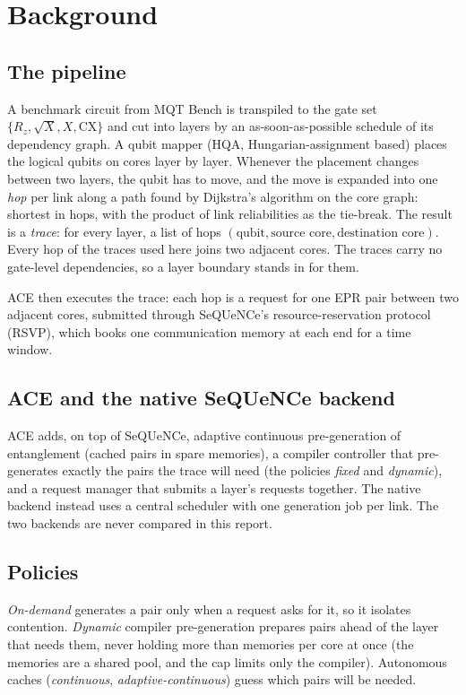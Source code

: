 \chapter{Background}

\section{The pipeline}
A benchmark circuit from MQT Bench is transpiled to the gate set $\{R_z,\sqrt X,X,\mathrm{CX}\}$ and cut into layers by an
as-soon-as-possible schedule of its dependency graph. A qubit mapper (HQA, Hungarian-assignment based) places the logical
qubits on cores layer by layer. Whenever the placement changes between two layers, the qubit has to move, and the move is expanded into one
\emph{hop} per link along a path found by Dijkstra's algorithm on the core graph: shortest in hops, with the product of
link reliabilities as the tie-break. The result is a \emph{trace}: for every layer, a list of hops
$(\text{qubit},\text{source core},\text{destination core})$. Every hop of the traces used here joins two adjacent cores.
The traces carry no gate-level dependencies, so a layer boundary stands in for them.

ACE then executes the trace: each hop is a request for one EPR pair between two adjacent cores, submitted through
SeQUeNCe's resource-reservation protocol (RSVP), which books one communication memory at each end for a time window.

\section{ACE and the native SeQUeNCe backend}
ACE adds, on top of SeQUeNCe, adaptive continuous pre-generation of entanglement (cached pairs in spare memories), a compiler
controller that pre-generates exactly the pairs the trace will need (the policies \emph{fixed} and \emph{dynamic}),
and a request manager that submits a layer's requests together. The native backend instead uses a central scheduler
with one generation job per link. The two backends are never compared in this report.

\section{Policies}
\emph{On-demand} generates a pair only when a request asks for it, so it isolates contention. \emph{Dynamic} compiler
pre-generation prepares pairs ahead of the layer that needs them, never holding more than  memories per core at once (the
memories are a shared pool, and the cap limits only the compiler). Autonomous caches (\emph{continuous}, \emph{adaptive-continuous}) guess which pairs
will be needed.

